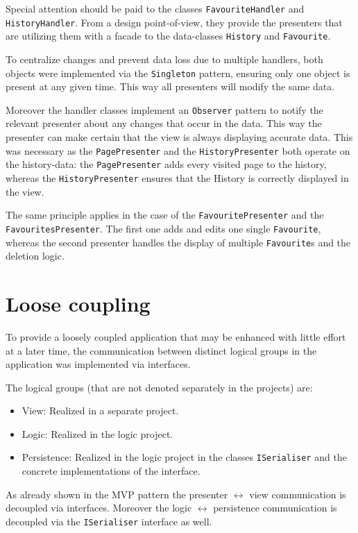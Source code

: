 Special attention should be paid to the classes \texttt{FavouriteHandler} and \texttt{HistoryHandler}.
From a design point-of-view, they provide the presenters that are utilizing them with a facade to the data-classes \texttt{History} and \texttt{Favourite}.

To centralize changes and prevent data loss due to multiple handlers, both objects were implemented via the \texttt{Singleton} pattern, ensuring only one object is present at any given time. This way all presenters will modify the same data.

Moreover the handler classes implement an \texttt{Observer} pattern to notify the relevant presenter about any changes that occur in the data. This way the presenter can make certain that the view is always displaying accurate data. This was necessary as the \texttt{PagePresenter} and the \texttt{HistoryPresenter} both operate on the history-data: the \texttt{PagePresenter} adds every visited page to the history, whereas the \texttt{HistoryPresenter} ensures that the History is correctly displayed in the view.

The same principle applies in the case of the \texttt{FavouritePresenter} and the \texttt{FavouritesPresenter}. The first one adds and edits one single \texttt{Favourite}, whereas the second presenter handles the display of multiple \texttt{Favourite}s and the deletion logic.

\section{Loose coupling}
\label{subsec:loose_coupling}

To provide a loosely coupled application that may be enhanced with little effort at a later time, the communication between distinct logical groups in the application was implemented via interfaces.

The logical groups (that are not denoted separately in the projects) are:

\begin{itemize}
\item View: Realized in a separate project.
\item Logic: Realized in the logic project.
\item Persistence: Realized in the logic project in the classes \texttt{ISerialiser} and the concrete implementations of the interface.
\end{itemize}

As already shown in the \ac{MVP} pattern the presenter $\longleftrightarrow$ view communication is decoupled via interfaces.
Moreover the logic $\longleftrightarrow$ persistence communication is decoupled via the \texttt{ISerialiser} interface as well.

